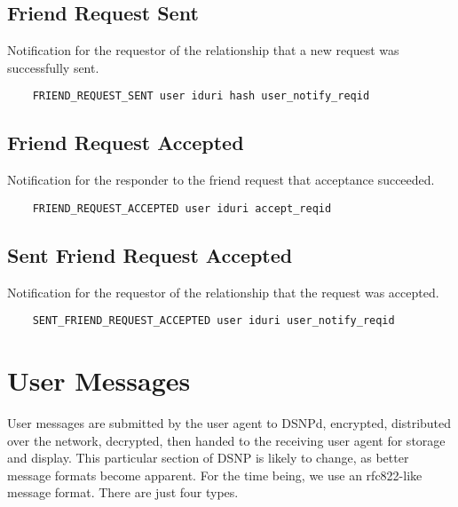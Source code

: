 \documentclass[letterpaper,11pt,oneside]{article}
\begin{document}
\subsection{Friend Request Sent}

Notification for the requestor of the relationship that a new request was
successfully sent.

\vspace{10pt}
\begin{verbatim}
    FRIEND_REQUEST_SENT user iduri hash user_notify_reqid
\end{verbatim}
\vspace{10pt}

\subsection{Friend Request Accepted}

Notification for the responder to the friend request that acceptance succeeded.

\vspace{10pt}
\begin{verbatim}
    FRIEND_REQUEST_ACCEPTED user iduri accept_reqid
\end{verbatim}
\vspace{10pt}

\subsection{Sent Friend Request Accepted}

Notification for the requestor of the relationship that the request was
accepted.

\vspace{10pt}
\begin{verbatim}
    SENT_FRIEND_REQUEST_ACCEPTED user iduri user_notify_reqid
\end{verbatim}
\vspace{10pt}

\section{User Messages}

User messages are submitted by the user agent to DSNPd, encrypted, distributed
over the network, decrypted, then handed to the receiving user agent for
storage and display. This particular section of DSNP is likely to change, as
better message formats become apparent. For the time being, we use an
rfc822-like message format. There are just four types.
\end{document}
